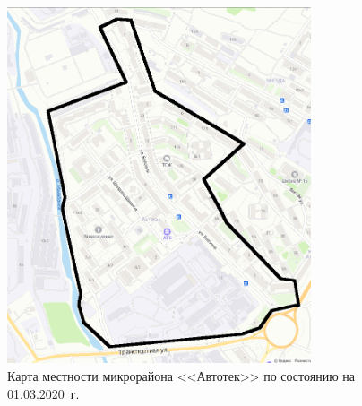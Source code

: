 \begin{figure}[h!]
  \begin{center}
    \includegraphics[width=0.8\textwidth]{authors/kodirev-fig-2.png}
  \end{center}
  \caption{Карта местности микрорайона <<Автотек>> по состоянию на 01.03.2020~г.}
  \label{fig:kodirev-fig-2}
\end{figure}

